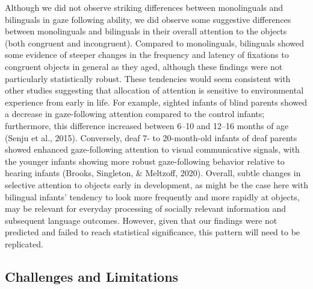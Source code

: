 \documentclass[,man,floatsintext]{apa6}
\begin{document}
Although we did not observe striking differences between monolinguals and bilinguals in gaze following ability, we did observe some suggestive differences between monolinguals and bilinguals in their overall attention to the objects (both congruent and incongruent). Compared to monolinguals, bilinguals showed some evidence of steeper changes in the frequency and latency of fixations to congruent objects in general as they aged, although these findings were not particularly statistically robust. These tendencies would seem consistent with other studies suggesting that allocation of attention is sensitive to environmental experience from early in life. For example, sighted infants of blind parents showed a decrease in gaze-following attention compared to the control infants; furthermore, this difference increased between 6--10 and 12--16 months of age (Senju et al., 2015). Conversely, deaf 7- to 20-month-old infants of deaf parents showed enhanced gaze-following attention to visual communicative signals, with the younger infants showing more robust gaze-following behavior relative to hearing infants (Brooks, Singleton, \& Meltzoff, 2020). Overall, subtle changes in selective attention to objects early in development, as might be the case here with bilingual infants' tendency to look more frequently and more rapidly at objects, may be relevant for everyday processing of socially relevant information and subsequent language outcomes. However, given that our findings were not predicted and failed to reach statistical significance, this pattern will need to be replicated.

\hypertarget{challenges-and-limitations}{%
\subsection{Challenges and Limitations}\label{challenges-and-limitations}}
\end{document}
